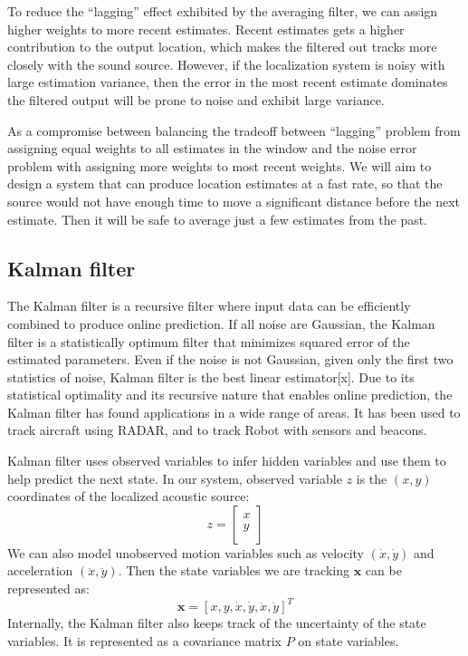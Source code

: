 To reduce the ``lagging'' effect exhibited by the averaging filter, we can assign higher weights to more recent estimates. Recent estimates gets a higher contribution to the output location, which makes the filtered out tracks more closely with the sound source. However, if the localization system is noisy with large estimation variance, then the error in the most recent estimate dominates the filtered output will be prone to noise and exhibit large variance.

As a compromise between balancing the tradeoff between ``lagging'' problem from assigning equal weights to all estimates in the window and the noise error problem with assigning more weights to most recent weights. We will aim to design a system that can produce location estimates at a fast rate, so that the source would not have enough time to move a significant distance before the next estimate. Then it will be safe to average just a few estimates from the past. 

\subsection{Kalman filter}
The Kalman filter is a recursive filter where input data can be efficiently combined to produce online prediction. If all noise are Gaussian, the Kalman filter is a statistically optimum filter that minimizes squared error of the estimated parameters. Even if the noise is not Gaussian, given only the first two statistics of noise, Kalman filter is the best linear estimator[x]. Due to its statistical optimality and its recursive nature that enables online prediction, the Kalman filter has found applications in a wide range of areas. It has been used to track aircraft using RADAR, and to track Robot with sensors and beacons.

Kalman filter uses observed variables to infer hidden variables and use them to help predict the next state. In our system, observed variable $z$ is the $(x,y)$ coordinates of the localized acoustic source:
\[
z = \left[\begin{array}{c}
x\\
y\\
\end{array}\right]
\]
We can also model unobserved motion variables such as velocity $(\dot{x}, \dot{y})$ and acceleration $(\ddot{x}, \ddot{y})$. Then the state variables we are tracking $\mathbf{x}$ can be represented as:
\[
\mathbf{x} = \left[x, y, \dot{x}, \dot{y}, \ddot{x}, \ddot{y}\right]^T
\]
Internally, the Kalman filter also keeps track of the uncertainty of the state variables. It is represented as a covariance matrix $P$ on state variables.

